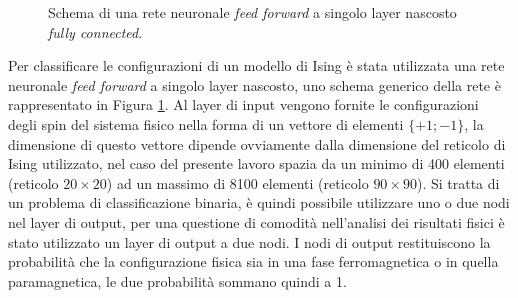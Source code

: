 \documentclass{article}
\begin{document}
\begin{figure}
\centering
{}
\caption{Schema di una rete neuronale \emph{feed forward} a singolo layer nascosto \emph{fully connected}.}
\label{fig:ffn}
\end{figure}

Per classificare le configurazioni di un modello di Ising è stata utilizzata una rete neuronale \emph{feed forward} a singolo layer nascosto, uno schema generico della rete è rappresentato in Figura \ref{fig:ffn}.
Al layer di input vengono fornite le configurazioni degli spin del sistema fisico nella forma di un vettore di elementi $\{+1;-1\}$, la dimensione di questo vettore dipende ovviamente dalla dimensione del reticolo di Ising utilizzato, nel caso del presente lavoro spazia da un minimo di 400 elementi (reticolo $20\times20$) ad un massimo di 8100 elementi (reticolo $90\times90$).
Si tratta di un problema di classificazione binaria, è quindi possibile utilizzare uno o due nodi nel layer di output, per una questione di comodità nell'analisi dei risultati fisici è stato utilizzato un layer di output a due nodi.
I nodi di output restituiscono la probabilità che la configurazione fisica sia in una fase ferromagnetica o in quella paramagnetica, le due probabilità sommano quindi a 1.
\end{document}
